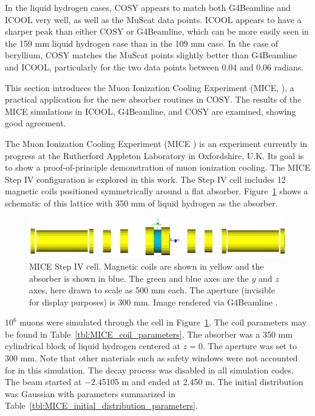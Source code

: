 In the liquid hydrogen cases, COSY appears to match both G4Beamline and ICOOL very well, as well as the MuScat data points. ICOOL appears to have a sharper peak than either COSY or G4Beamline, which can be more easily seen in the 159 mm liquid hydrogen case than in the 109 mm case. In the case of beryllium, COSY matches the MuScat points slightly better than G4Beamline and ICOOL, particularly for the two data points between 0.04 and 0.06 radians.

\label{sec:mice}

This section introduces the Muon Ionization Cooling Experiment (MICE, \cite{mice}), a practical application for the new absorber routines in COSY. The results of the MICE simulations in ICOOL, G4Beamline, and COSY are examined, showing good agreement.

\label{ssc:miceIntro}
The Muon Ionization Cooling Experiment (MICE \cite{mice}) is an experiment currently in progress at the Rutherford Appleton Laboratory in Oxfordshire, U.K. Its goal is to show a proof-of-principle demonstration of muon ionization cooling. The MICE Step IV configuration is explored in this work. The Step IV cell includes 12 magnetic coils positioned symmetrically around a flat absorber. Figure~\ref{fig:miceStepIV} shows a schematic of this lattice with 350 mm of liquid hydrogen as the absorber.
\begin{figure}[h!]
  \centering
    \includegraphics[width=\textwidth]{Figures/miceStepIV} 
  \caption[MICE Step IV cell.]{MICE Step IV cell. Magnetic coils are shown in yellow and the absorber is shown in blue. The green and blue axes are the $y$ and $z$ axes, here drawn to scale as 500 mm each. The aperture (invisible for display purposes) is 300 mm. Image rendered via G4Beamline \cite{g4bl}.}
  \label{fig:miceStepIV}
\end{figure}

\label{ssc:miceResults}
$10^6$ muons were simulated through the cell in Figure~\ref{fig:miceStepIV}. The coil parameters may be found in Table~\ref{tbl:MICE_coil_parameters}. The absorber was a 350 mm cylindrical block of liquid hydrogen centered at $z=0$. The aperture was set to 300 mm. Note that other materials such as safety windows were not accounted for in this simulation. The decay process was disabled in all simulation codes. The beam started at $-$2.45105 m and ended at 2.450 m. The initial distribution was Gaussian with parameters summarized in Table~\ref{tbl:MICE_initial_distribution_parameters}.


